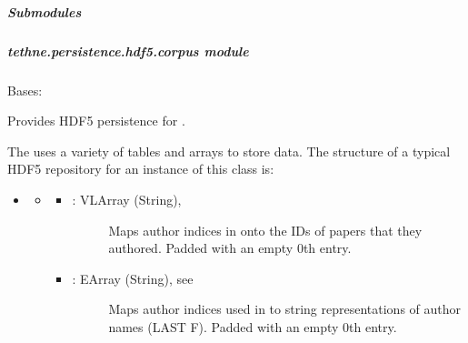 \documentclass[letterpaper,10pt,english]{sphinxmanual}
\begin{document}
\subparagraph{Submodules}
\label{tethne.persistence.hdf5:submodules}

\subparagraph{tethne.persistence.hdf5.corpus module}
\label{tethne.persistence.hdf5.corpus:module-tethne.persistence.hdf5.corpus}\label{tethne.persistence.hdf5.corpus::doc}\label{tethne.persistence.hdf5.corpus:tethne-persistence-hdf5-corpus-module}

\begin{fulllineitems}
\label{tethne.persistence.hdf5.corpus:tethne.persistence.hdf5.corpus.HDF5Corpus}
Bases: {\hyperref[tethne.classes.corpus:tethne.classes.corpus.Corpus]{}}

Provides HDF5 persistence for {\hyperref[tethne.classes.corpus:tethne.classes.corpus.Corpus]{}}.

The {\hyperref[tethne.persistence.hdf5.corpus:tethne.persistence.hdf5.corpus.HDF5Corpus]{}} uses a variety of tables and arrays to
store data. The structure of a typical HDF5 repository for an instance
of this class is:
\begin{itemize}
\item {} 
\code{/}
\begin{itemize}
\item {} 
\begin{itemize}
\item {} \begin{description}
\item[{: VLArray (String), {\hyperref[tethne.persistence.hdf5.util:tethne.persistence.hdf5.util.vlarray_dict]{}}}] \leavevmode
Maps author indices in  onto the IDs of papers that they
authored. Padded with an empty 0th entry.

\end{description}

\item {} \begin{description}
\item[{: EArray (String), see {\hyperref[tethne.persistence.hdf5.util:tethne.persistence.hdf5.util.vlarray_dict]{}}}] \leavevmode
Maps author indices used in  to string representations of 
author names (LAST F). Padded with an empty 0th entry.


\end{description}
\end{itemize}
\end{itemize}
\end{itemize}
\end{fulllineitems}
\end{document}
